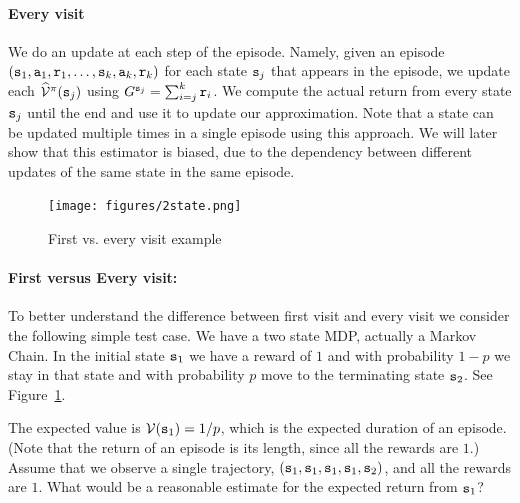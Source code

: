 \paragraph{Every visit}
We do an update at each step of the episode. Namely, given an
episode $({\tt s}_1, {\tt a}_1, {\tt r}_1, \ldots ,
{\tt s}_k,{\tt a}_k,{\tt r}_k)$ for each state ${\tt s}_j$ that
appears in the episode, we update each
$\widehat{\mathcal{V}}^\pi({\tt s}_j)$ using
$G^{{\tt s}_j}=\sum_{i=j}^k {\tt r}_i$. We compute the actual
return from every state ${\tt s}_j$ until the end and use it to update
our approximation. Note that a state can be updated multiple times
in  a single episode using this approach. We will later show that
this estimator is biased, due to the dependency between different
updates of the same state in the same episode.



\begin{figure}
  \begin{centering}
 \texttt{[image: figures/2state.png]}\\
  \caption{First vs. every visit example}\label{fig:2state}
  \end{centering}
\end{figure}

\paragraph{First versus Every visit:}
%
To better understand the difference between first visit and every
visit we consider the following simple test case. We have a two
state MDP, actually a Markov Chain. In the initial state ${\tt s}_1$
we have a reward of $1$ and with probability $1-p$ we stay in that
state and with probability $p$ move to the terminating state
${\tt s}_2$. See Figure~\ref{fig:2state}.

The expected value is $\mathcal{V}({\tt s}_1)=1/p$, which is the expected
duration of an episode. (Note that the return of an episode is its
length, since all the rewards are $1$.) Assume that we observe a single
trajectory, $({\tt s}_1,{\tt s}_1,{\tt s}_1,{\tt s}_1,{\tt s}_2)$, and
all the rewards are $1$. What would be a reasonable estimate for the
expected return from ${\tt s}_1$?

